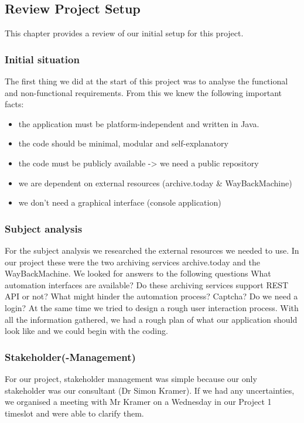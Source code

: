 \subsection{Review Project Setup}
This chapter provides a review of our initial setup for this project. 

\subsubsection{Initial situation}
The first thing we did at the start of this project was to analyse the functional and non-functional requirements. 
From this we knew the following important facts:
\begin{itemize}
    \item the application must be platform-independent and written in Java.
    \item the code should be minimal, modular and self-explanatory
    \item the code must be publicly available -> we need a public repository
    \item we are dependent on external resources (archive.today \& WayBackMachine)
    \item we don't need a graphical interface (console application)
\end{itemize}

\subsubsection{Subject analysis}
For the subject analysis we researched the external resources we needed to use. In our project these were the two archiving services archive.today and the WayBackMachine.
We looked for answers to the following questions 
What automation interfaces are available? Do these archiving services support REST API or not? What might hinder the automation process? Captcha?
Do we need a login? 
At the same time we tried to design a rough user interaction process.
With all the information gathered, we had a rough plan of what our application should look like and we could begin with the coding.

\subsubsection{Stakeholder(-Management)}
For our project, stakeholder management was simple because our only stakeholder was our consultant (Dr Simon Kramer).
If we had any uncertainties, we organised a meeting with Mr Kramer on a Wednesday in our Project 1 timeslot and were able to clarify them.

